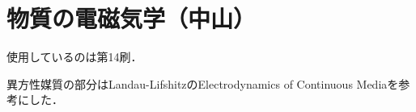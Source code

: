 \documentclass[a4paper]{ltjsreport}
\begin{document}
\chapter*{物質の電磁気学（中山）}
使用しているのは第14刷．

異方性媒質の部分はLandau-LifshitzのElectrodynamics of Continuous Mediaを参考にした．






\end{document}
